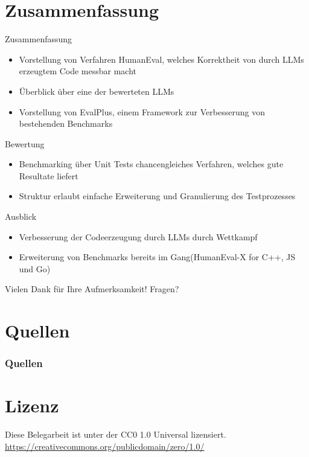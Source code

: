 \documentclass{beamer}              %
\begin{document}
\section{Zusammenfassung}
\begin{frame}{Zusammenfassung}
\begin{itemize}
    \item Vorstellung von Verfahren HumanEval, welches Korrektheit von durch LLMs erzeugtem Code messbar macht
    \item Überblick über eine der bewerteten LLMs
    \item Vorstellung von EvalPlus, einem Framework zur Verbesserung von bestehenden Benchmarks
\end{itemize}
\end{frame}

\begin{frame}{Bewertung}
\begin{itemize}
    \item Benchmarking über Unit Tests chancengleiches Verfahren, welches gute Resultate liefert
    \item Struktur erlaubt einfache Erweiterung und Granulierung des Testprozesses
\end{itemize}
\end{frame}

\begin{frame}{Ausblick}
\begin{itemize}
    \item Verbesserung der Codeerzeugung durch LLMs durch Wettkampf
    \item Erweiterung von Benchmarks bereits im Gang(HumanEval-X\cite{zheng2023codegeex} for C++, JS und Go)
\end{itemize}
\end{frame}

\begin{frame}{}
\centering Vielen Dank für Ihre Aufmerksamkeit! Fragen?
\end{frame}

\section{Quellen}
\begin{frame}[allowframebreaks]
        \frametitle{Quellen}
        
        
\end{frame}

\section{Lizenz}
\begin{frame}{}
   \centering Diese Belegarbeit ist unter der CC0 1.0 Universal lizensiert. \url{https://creativecommons.org/publicdomain/zero/1.0/}
\end{frame}
\end{document}
